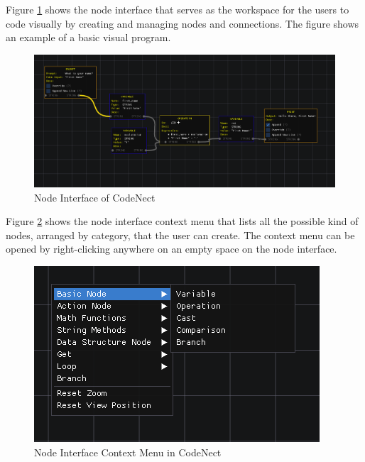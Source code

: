 \parx
Figure \ref{fig:cn_node_interface} shows the node interface that serves as the
workspace for the users to code visually by creating and managing nodes and
connections. The figure shows an example of a basic visual program.

\begin{figure}[H]
	\centering
	\captionsetup{justification=centering}
	\captionsetup[figure]{list=yes}
	\includegraphics[width=\linewidth]{media/sc_node_interface.png}
	\caption[Node Interface of CodeNect]{Node Interface of CodeNect}
	\label{fig:cn_node_interface}
\end{figure}

\parx
Figure \ref{fig:cn_node_context} shows the node interface context menu that
lists all the possible kind of nodes, arranged by category, that the user can
create. The context menu can be opened by right-clicking anywhere on an empty
space on the node interface.

\begin{figure}[H]
	\centering
	\captionsetup{justification=centering}
	\captionsetup[figure]{list=yes}
	\includegraphics[width=\linewidth]{media/sc_node_interface_context.png}
	\caption[Node Interface Context Menu in CodeNect]{Node Interface Context Menu in CodeNect}
	\label{fig:cn_node_context}
\end{figure}

